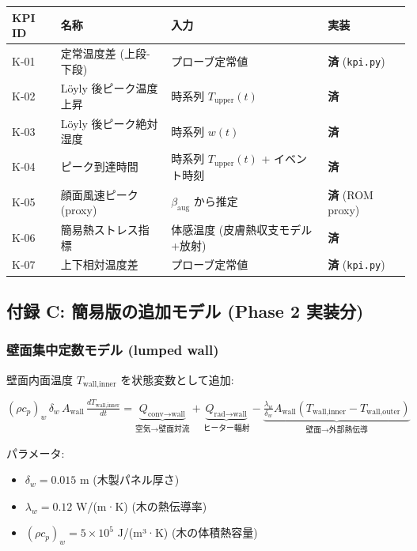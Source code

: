 \documentclass[a4paper,11pt]{article}
\begin{document}
{\small
\noindent
\begin{tabularx}{\textwidth}{|l|L|L|L|}
\hline
\textbf{KPI ID} & \textbf{名称} & \textbf{入力} & \textbf{実装} \\
\hline
K-01 & 定常温度差 (上段-下段) & プローブ定常値 & \textbf{済} (\texttt{kpi.py}) \\
\hline
K-02 & Löyly 後ピーク温度上昇 & 時系列 $T_{\text{upper}}(t)$ & \textbf{済} \\
\hline
K-03 & Löyly 後ピーク絶対湿度 & 時系列 $w(t)$ & \textbf{済} \\
\hline
K-04 & ピーク到達時間 & 時系列 $T_{\text{upper}}(t)$ + イベント時刻 & \textbf{済} \\
\hline
K-05 & 顔面風速ピーク (proxy) & $\beta_{\text{aug}}$ から推定 & \textbf{済} (ROM proxy) \\
\hline
K-06 & 簡易熱ストレス指標 & 体感温度 (皮膚熱収支モデル+放射) & \textbf{済} \\
\hline
K-07 & 上下相対温度差 & プローブ定常値 & \textbf{済} (\texttt{kpi.py}) \\
\hline
\end{tabularx}
}


\subsection{付録 C: 簡易版の追加モデル (Phase 2 実装分)}

\subsubsection{壁面集中定数モデル (lumped wall)}

壁面内面温度 $T_{\text{wall,inner}}$ を状態変数として追加:

$
(\rho c_p)_w \, \delta_w \, A_{\text{wall}} \, \frac{dT_{\text{wall,inner}}}{dt}
= \underbrace{Q_{\text{conv→wall}}}_{\text{空気→壁面対流}}
+ \underbrace{Q_{\text{rad→wall}}}_{\text{ヒーター輻射}}
- \underbrace{\frac{\lambda_w}{\delta_w} A_{\text{wall}} (T_{\text{wall,inner}} - T_{\text{wall,outer}})}_{\text{壁面→外部熱伝導}}
$

パラメータ:

\begin{itemize} \item $\delta_w = 0.015$ m (木製パネル厚さ) \end{itemize}
\begin{itemize} \item $\lambda_w = 0.12$ W/(m·K) (木の熱伝導率) \end{itemize}
\begin{itemize} \item $(\rho c_p)_w = 5 \times 10^5$ J/(m³·K) (木の体積熱容量) \end{itemize}
\end{document}
